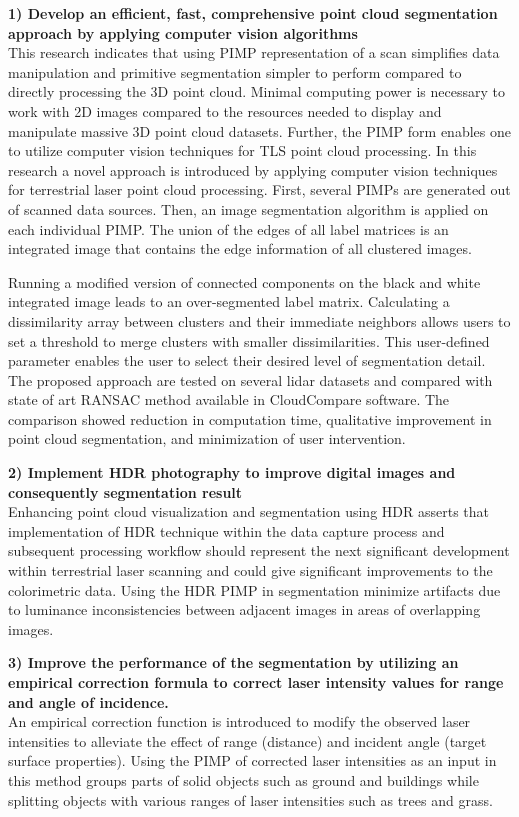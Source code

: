 \documentclass[final,3p,times,twocolumn,authoryear]{elsarticle}
\begin{document}
\noindent \textbf{1) Develop an efficient, fast, comprehensive point cloud segmentation approach by applying computer vision algorithms}\\
\indent This research indicates that using PIMP representation of a scan simplifies data manipulation and primitive segmentation simpler to perform compared to directly processing the 3D point cloud. Minimal computing power is necessary to work with 2D images compared to the resources needed to display and manipulate massive 3D point cloud datasets. Further, the PIMP form enables one to utilize computer vision techniques for TLS point cloud processing.  In this research a novel approach is introduced by applying computer vision techniques for terrestrial laser point cloud processing. First, several PIMPs are generated out of scanned data sources. Then, an image segmentation algorithm is applied on each individual PIMP. The union of the edges of all label matrices is an integrated image that contains the edge information of all clustered images.

Running a modified version of connected components on the black and white integrated image leads to an over-segmented label matrix. Calculating a dissimilarity array between clusters and their immediate neighbors allows users to set a threshold to merge clusters with smaller dissimilarities. This user-defined parameter enables the user to select their desired level of segmentation detail. The proposed approach are tested on several lidar datasets and compared with state of art RANSAC method available in CloudCompare software. The comparison showed reduction in computation time, qualitative improvement in point cloud segmentation, and minimization of user intervention.

\noindent \textbf{2) Implement HDR photography to improve digital images and consequently segmentation result}\\
\indent Enhancing point cloud visualization and segmentation using HDR asserts that implementation of HDR technique within the data capture process and subsequent processing workflow should represent the next significant development within terrestrial laser scanning and could give significant improvements to the colorimetric data. 
Using the HDR PIMP in segmentation minimize artifacts due to luminance inconsistencies between adjacent images in areas of overlapping images.

\noindent \textbf{3) Improve the performance of the segmentation by utilizing an empirical correction formula to correct laser intensity values for range and angle of incidence.}\\
\indent An empirical correction function is introduced to modify the observed laser intensities to alleviate the effect of range (distance) and incident angle (target surface properties). Using the PIMP of corrected laser intensities as an input in this method groups parts of solid objects such as ground and buildings while splitting objects with various ranges of laser intensities such as trees and grass.
\end{document}

